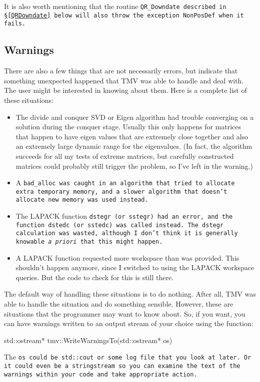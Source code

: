 It is also worth mentioning that the routine \tt{QR\_Downdate} described in \S\ref{QRDowndate}
below will also throw the exception \tt{NonPosDef} when it fails.

\subsection{Warnings}
\label{Warnings}

There are also a few things that are not necessarily errors,
but indicate that something unexpected happened that TMV was able to handle
and deal with.  The user might be interested in knowing about them.
Here is a complete list of these situations:
\begin{itemize}
\item The divide and conquer SVD or Eigen algorithm had trouble converging on a 
solution during the conquer stage.  Usually this only happens for matrices
that happen to have eigen values that are extremely close together and 
also an extremely large dynamic range for the eigenvalues.
(In fact, the algorithm succeeds for all my tests of extreme matrices,
but carefully constructed matrices could probably still trigger the problem,
so I've left in the warning.)
\item A \tt{bad_alloc} was caught in an algorithm that tried to allocate extra temporary memory, and
a slower algorithm that doesn't allocate new memory was used instead.
\item The LAPACK function \tt{dstegr} (or \tt{sstegr}) had an error, and the function
\tt{dstedc} (or \tt{sstedc}) was called instead.  The \tt{dstegr} calculation was wasted,
although I don't think it is generally knowable {\it a priori} that this might happen.
\item A LAPACK function requested more workspace than was provided.  This shouldn't happen
anymore, since I switched to using the LAPACK workspace queries.  But the code to check
for this is still there.
\end{itemize}

The default way of handling these situations is to do nothing.  After all,
TMV was able to handle the situation and do something sensible.
However, these are situations that the programmer may want to know about.
So, if you want, you can have warnings written to an output stream of 
your choice using the function:
\begin{tmvcode}
std::ostream* tmv::WriteWarningsTo(std::ostream* os)
\end{tmvcode}
The \tt{os} could be \tt{std::cout} or some log file that you look at later.
Or it could even be a \tt{stringstream} so you can examine the text
of the warnings within your code and take appropriate action.


